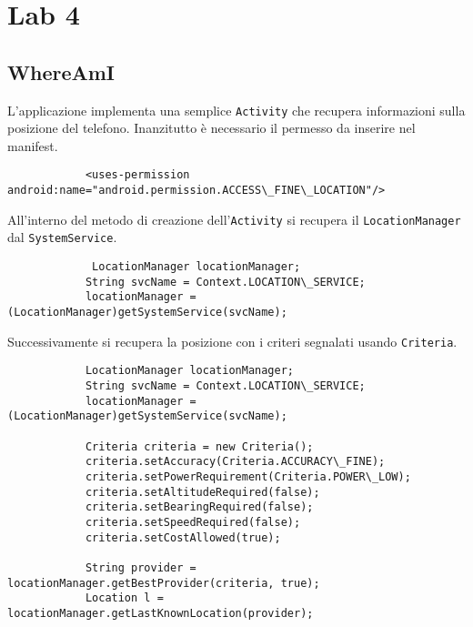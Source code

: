 	\section{Lab 4}

	\subsection{WhereAmI}
		L'applicazione implementa una semplice \lstinline|Activity| che recupera informazioni sulla posizione del telefono. Inanzitutto è necessario il permesso da inserire nel manifest.
		\begin{lstlisting}
			<uses-permission android:name="android.permission.ACCESS\_FINE\_LOCATION"/>
		\end{lstlisting}
		
		All'interno del metodo di creazione dell'\lstinline|Activity| si recupera il \lstinline|LocationManager| dal \lstinline|SystemService|.
		\begin{lstlisting}
			 LocationManager locationManager;
			String svcName = Context.LOCATION\_SERVICE;
			locationManager = (LocationManager)getSystemService(svcName);
		\end{lstlisting}
		
		Successivamente si recupera la posizione con i criteri segnalati usando \lstinline|Criteria|.
		\begin{lstlisting}
			LocationManager locationManager;
			String svcName = Context.LOCATION\_SERVICE;
			locationManager = (LocationManager)getSystemService(svcName);
			
			Criteria criteria = new Criteria();
			criteria.setAccuracy(Criteria.ACCURACY\_FINE);
			criteria.setPowerRequirement(Criteria.POWER\_LOW);
			criteria.setAltitudeRequired(false);
			criteria.setBearingRequired(false);
			criteria.setSpeedRequired(false);
			criteria.setCostAllowed(true);
			
			String provider = locationManager.getBestProvider(criteria, true);
			Location l = locationManager.getLastKnownLocation(provider);
		\end{lstlisting}
		
